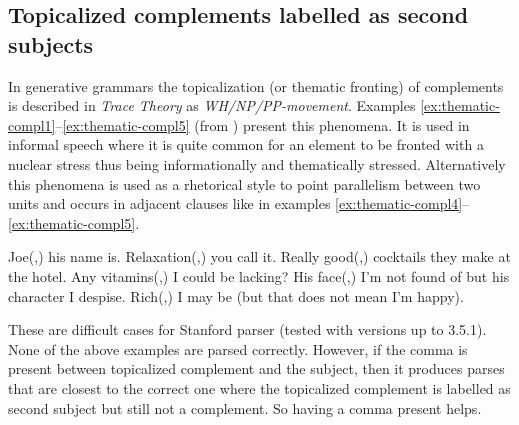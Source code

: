 \subsection{Topicalized complements labelled as second subjects}   
%        
%        
In generative grammars the topicalization (or thematic fronting) of complements is described in \textit{Trace Theory} as \textit{WH/NP/PP-movement}. Examples \ref{ex:thematic-compl1}--\ref{ex:thematic-compl5} (from \citep[pp.~412-413]{Quirk1985}) present this phenomena. It is used in informal speech where it is quite common for an element to be fronted with a nuclear stress thus being informationally and thematically stressed. Alternatively this phenomena is used as a rhetorical style to point parallelism between two units and occurs in adjacent clauses like in examples \ref{ex:thematic-compl4}--\ref{ex:thematic-compl5}.

\begin{exe}
\ex\label{ex:thematic-compl1} Joe(,) his name is. 
\ex\label{ex:thematic-compl2} Relaxation(,) you call it. 
\ex\label{ex:thematic-compl3} Really good(,) cocktails they make at the hotel. 
\ex\label{ex:thematic-compl3.5} Any vitamins(,) I could be lacking? 
\ex\label{ex:thematic-compl4} His face(,) I'm not found of but his character I despise.
\ex\label{ex:thematic-compl5} Rich(,) I may be (but that does not mean I'm happy).
\end{exe}

These are difficult cases for Stanford parser (tested with versions up to 3.5.1). None of the above examples are parsed correctly. However, if the comma is present between topicalized complement and the subject, then it produces parses that are closest to the correct one where the topicalized complement is labelled as second subject but still not a complement. So having a comma present helps. 

